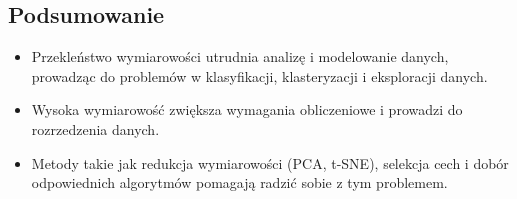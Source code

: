 \subsection{Podsumowanie}
\begin{itemize}
    \item Przekleństwo wymiarowości utrudnia analizę i modelowanie danych, prowadząc do problemów w klasyfikacji, klasteryzacji i eksploracji danych.
    \item Wysoka wymiarowość zwiększa wymagania obliczeniowe i prowadzi do rozrzedzenia danych.
    \item Metody takie jak redukcja wymiarowości (PCA, t-SNE), selekcja cech i dobór odpowiednich algorytmów pomagają radzić sobie z tym problemem.
\end{itemize}
